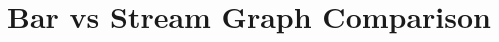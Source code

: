 \documentclass[12pt]{article}
\begin{document}
\section{Bar vs Stream Graph Comparison}
 



\end{document}
